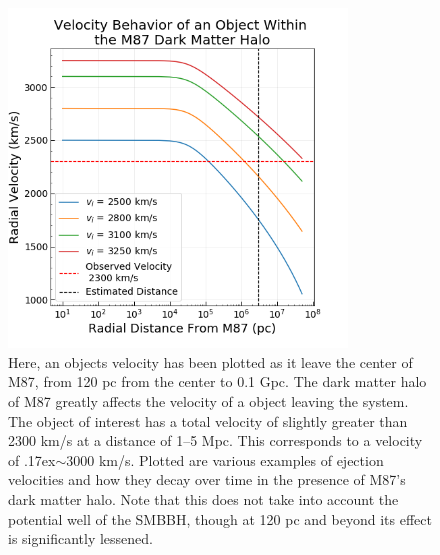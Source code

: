 \documentclass{aastex62}
\begin{document}
\begin{figure}
\includegraphics[width=9cm,height=9cm]{./Images/velocity_behavior.png}
\centering
\caption{Here, an objects velocity has been plotted as it leave the center of M87, from 120 pc from the center to 0.1 Gpc. The dark matter halo of M87 greatly affects the velocity of a object leaving the system. The object of interest has a total velocity of slightly greater than 2300 km/s at a distance of 1--5 Mpc. This corresponds to a velocity of  {\raise.17ex\hbox{$\scriptstyle\mathtt{\sim}$}}3000 km/s. Plotted are various examples of ejection velocities and how they decay over time in the presence of M87's dark matter halo. Note that this does not take into account the potential well of the SMBBH, though at 120 pc and beyond its effect is significantly lessened. \label{fig1}}
\end{figure}
\end{document}
